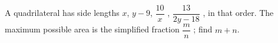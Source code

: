 A quadrilateral has side lengths $x$, $y-9$, $\dfrac{10}{x}$ , $\dfrac{13}{2y-18}$ , in that order. The maximum possible area is the simplified fraction   $\dfrac{m}{n}$  ; find $m + n$.
